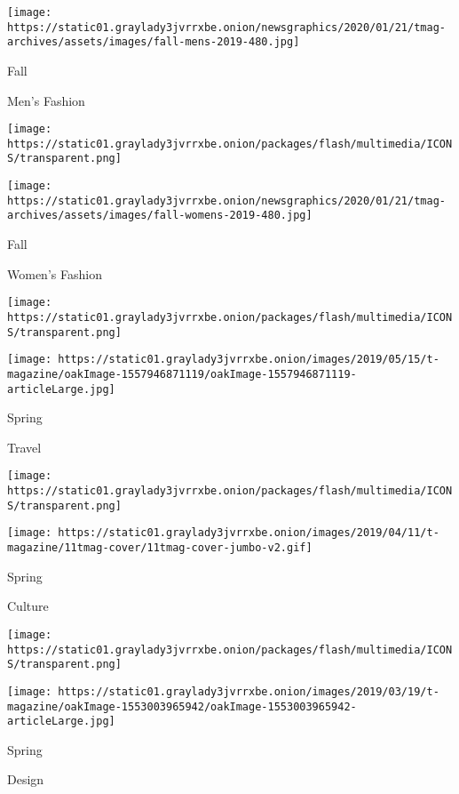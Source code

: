 \texttt{[image: https://static01.graylady3jvrrxbe.onion/newsgraphics/2020/01/21/tmag-archives/assets/images/fall-mens-2019-480.jpg]}

Fall

Men's Fashion

\href{https://www.nytimes3xbfgragh.onion/issue/t-magazine/2019/08/08/ts-aug-18-womens-fashion-issue}{}

\texttt{[image: https://static01.graylady3jvrrxbe.onion/packages/flash/multimedia/ICONS/transparent.png]}

\texttt{[image: https://static01.graylady3jvrrxbe.onion/newsgraphics/2020/01/21/tmag-archives/assets/images/fall-womens-2019-480.jpg]}

Fall

Women's Fashion

\href{https://www.nytimes3xbfgragh.onion/issue/t-magazine/2019/05/08/ts-may-19-travel-issue}{}

\texttt{[image: https://static01.graylady3jvrrxbe.onion/packages/flash/multimedia/ICONS/transparent.png]}

\texttt{[image: https://static01.graylady3jvrrxbe.onion/images/2019/05/15/t-magazine/oakImage-1557946871119/oakImage-1557946871119-articleLarge.jpg]}

Spring

Travel

\href{https://www.nytimes3xbfgragh.onion/issue/t-magazine/2019/04/06/ts-april-14-culture-issue}{}

\texttt{[image: https://static01.graylady3jvrrxbe.onion/packages/flash/multimedia/ICONS/transparent.png]}

\texttt{[image: https://static01.graylady3jvrrxbe.onion/images/2019/04/11/t-magazine/11tmag-cover/11tmag-cover-jumbo-v2.gif]}

Spring

Culture

\href{https://www.nytimes3xbfgragh.onion/issue/t-magazine/2019/03/11/ts-march-24-design-issue}{}

\texttt{[image: https://static01.graylady3jvrrxbe.onion/packages/flash/multimedia/ICONS/transparent.png]}

\texttt{[image: https://static01.graylady3jvrrxbe.onion/images/2019/03/19/t-magazine/oakImage-1553003965942/oakImage-1553003965942-articleLarge.jpg]}

Spring

Design

\href{https://www.nytimes3xbfgragh.onion/issue/t-magazine/2019/02/20/ts-march-3-mens-fashion-issue}{}

